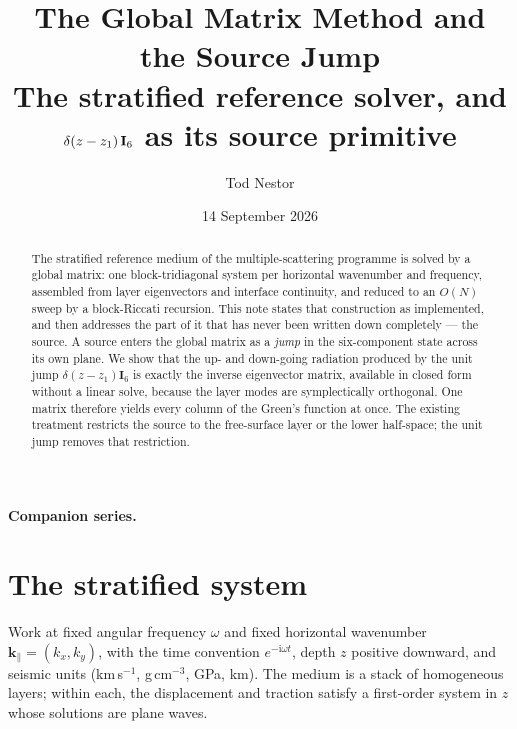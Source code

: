 \documentclass[11pt,a4paper]{article}
\title{\bfseries The Global Matrix Method and the Source Jump\\[4pt]
\large The stratified reference solver, and
$\delta(z-z_1)\,\bI_6$ as its source primitive}
\author{Tod Nestor}
\date{14 September 2026}
\newcommand{\ii}{\mathrm{i}}
\newcommand{\bI}{\mathbf{I}}
\newcommand{\kpar}{\mathbf{k}_{\parallel}}
\begin{document}
\maketitle

\begin{abstract}
The stratified reference medium of the multiple-scattering programme is solved
by a global matrix: one block-tridiagonal system per horizontal wavenumber and
frequency, assembled from layer eigenvectors and interface continuity, and
reduced to an $O(N)$ sweep by a block-Riccati recursion. This note states that
construction as implemented, and then addresses the part of it that has never
been written down completely --- the source. A source enters the global matrix
as a \emph{jump} in the six-component state across its own plane. We show that
the up- and down-going radiation produced by the unit jump
$\delta(z-z_1)\bI_6$ is exactly the inverse eigenvector matrix, available in
closed form without a linear solve, because the layer modes are symplectically
orthogonal. One matrix therefore yields every column of the Green's function at
once. The existing treatment restricts the source to the free-surface layer or
the lower half-space; the unit jump removes that restriction.
\end{abstract}

\bigskip
\noindent\textbf{Companion series.}

\tableofcontents
\bigskip

\section{The stratified system}\label{sec:strat}

Work at fixed angular frequency $\omega$ and fixed horizontal wavenumber
$\kpar=(k_x,k_y)$, with the time convention $e^{-\ii\omega t}$, depth $z$
positive downward, and seismic units (km\,s$^{-1}$, g\,cm$^{-3}$, GPa, km). The
medium is a stack of homogeneous layers; within each, the displacement and
traction satisfy a first-order system in $z$ whose solutions are plane waves.
\end{document}
